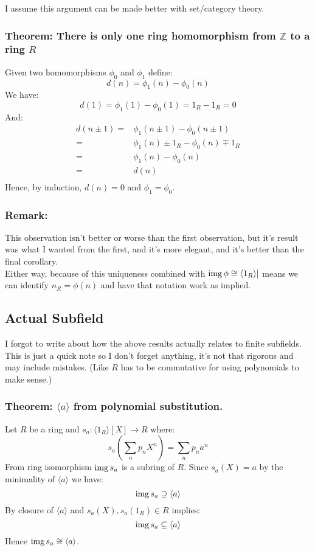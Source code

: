 I assume this argument can be made better with set/category theory.

\subsubsection{Theorem: There is only one ring homomorphism from $\mathbb{Z}$ to a ring $R$}
Given two homomorphisms $\phi_0$ and $\phi_1$ define:
\[d(n) = \phi_1(n)-\phi_0(n)\]
We have:
\[d(1) = \phi_1(1)-\phi_0(1) = 1_R-1_R = 0\]
And:
\begin{equation*}
\begin{aligned}
	d(n\pm1) =& \phi_1(n\pm1) - \phi_0(n\pm1) \\
	=& \phi_1(n) \pm 1_R - \phi_0(n) \mp 1_R \\
	=& \phi_1(n) - \phi_0(n) \\
	=&d(n)\\
\end{aligned}
\end{equation*}
Hence,
by induction,
$d(n)=0$ and $\phi_1 = \phi_0$.

\subsubsection{Remark:}
This observation isn't better or worse than the first observation,
but it's result was what I wanted from the first,
and it's more elegant,
and it's better than the final corollary.
\\

Either way, because of this uniqueness combined with $\operatorname{img}\phi\cong\langle 1_R \rangle|$ means we can identify $n_R = \phi(n)$ and have that notation work as implied.

\subsection{Actual Subfield}
I forgot to write about how the above results actually relates to finite subfields.
This is just a quick note so I don't forget anything, it's not that rigorous and may include mistakes.
(Like $R$ has to be commutative for using polynomials to make sense.)

\subsubsection{Theorem: $\langle a \rangle$ from polynomial substitution.}
Let $R$ be a ring and $s_a: \langle 1_R \rangle[X] \rightarrow R$ where:
\[s_a\left(\sum_np_nX^n\right) = \sum_np_na^n\]
From ring isomorphism $\operatorname{img} s_a$ is a subring of $R$.
Since $s_a(X)=a$ by the minimality of $\langle a \rangle$ we have:
\[\operatorname{img} s_a \supseteq \langle a \rangle\] 
By closure of $\langle a \rangle$ and $s_a(X),s_a(1_R)\in R$ implies:
\[\operatorname{img} s_a \subseteq \langle a \rangle\] 
Hence $\operatorname{img} s_a\cong\langle a \rangle$.

